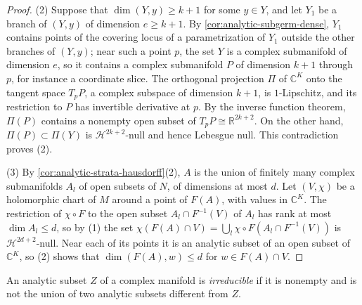 \begin{proof}
(2) Suppose that $\dim(Y,y)\geq k+1$ for some $y\in Y$, and let $Y_1$ be a branch of $(Y,y)$ of dimension $e\geq k+1$. By \cref{cor:analytic-subgerm-dense}, $Y_1$ contains points of the covering locus of a parametrization of $Y_1$ outside the other branches of $(Y,y)$; near such a point $p$, the set $Y$ is a complex submanifold of dimension $e$, so it contains a complex submanifold $P$ of dimension $k+1$ through $p$, for instance a coordinate slice. The orthogonal projection $\Pi$ of $\mathbb C^K$ onto the tangent space $T_pP$, a complex subspace of dimension $k+1$, is $1$-Lipschitz, and its restriction to $P$ has invertible derivative at $p$. By the inverse function theorem, $\Pi(P)$ contains a nonempty open subset of $T_pP\cong\mathbb R^{2k+2}$. On the other hand, $\Pi(P)\subset\Pi(Y)$ is $\mathcal H^{2k+2}$-null and hence Lebesgue null. This contradiction proves (2).

(3) By \cref{cor:analytic-strata-hausdorff}(2), $A$ is the union of finitely many complex submanifolds $A_l$ of open subsets of $N$, of dimensions at most $d$. Let $(V,\chi)$ be a holomorphic chart of $M$ around a point of $F(A)$, with values in $\mathbb C^K$. The restriction of $\chi\circ F$ to the open subset $A_l\cap F^{-1}(V)$ of $A_l$ has rank at most $\dim A_l\leq d$, so by (1) the set $\chi(F(A)\cap V)=\bigcup_l\chi\circ F(A_l\cap F^{-1}(V))$ is $\mathcal H^{2d+2}$-null. Near each of its points it is an analytic subset of an open subset of $\mathbb C^K$, so (2) shows that $\dim(F(A),w)\leq d$ for $w\in F(A)\cap V$.
\end{proof}

An analytic subset $Z$ of a complex manifold is \emph{irreducible} if it is nonempty and is not the union of two analytic subsets different from $Z$.

